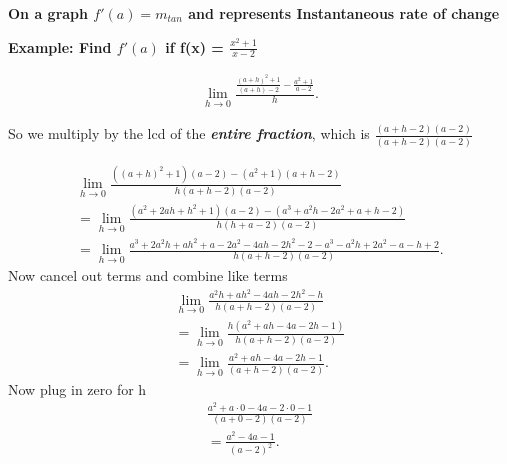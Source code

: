 \documentclass{report}
\begin{document}
        \bigbreak \noindent 
        \textbf{On a graph $f\prime (a) = m_{tan}$ and represents Instantaneous rate of change}

        \bigbreak \noindent \bigbreak \noindent 
        \begin{large}
            \textbf{Example: Find $f\prime (a)$ if f(x) = $\frac{x^2+1}{x-2}$}
        \end{large}
        
        \bigbreak \noindent \bigbreak \noindent 
        \begin{align*}
            \lim\limits_{h \to 0}{ \frac{ \frac{ \left(a+h\right)^2 + 1}{ \left(a+h\right)-2} - \frac{a^2+1}{a-2}}{h}}
        .\end{align*}

        \bigbreak \noindent 
        So we multiply by the lcd of the \textbf{\textit{entire fraction}}, which is $ \frac{ \left(a+h-2\right) \left(a-2\right)}{ \left(a+h-2\right) \left(a-2\right)}$

        \begin{align*}
            \lim\limits_{h \to 0}{ \frac{ \left( \left(a+h\right)^2+1\right) \left(a-2\right) - \left(a^2+1\right) \left(a+h-2\right)}{h \left(a+h-2\right) \left(a-2\right)}} \\ 
            = \lim\limits_{h \to 0}{ \frac{ \left(a^2+2ah+h^2+1\right) \left(a-2\right) - \left(a^3+a^2h-2a^2+a+h-2\right)}{h \left(h+a-2\right)(a-2)}} \\ 
            = \lim\limits_{h \to 0}{ \frac{a^3+2a^2h+ah^2+a-2a^2-4ah-2h^2-2-a^3-a^2h+2a^2-a-h+2}{h \left(a+h-2\right)(a-2)}}
        .\end{align*}
        \bigbreak \noindent 
        Now cancel out terms and combine like terms
        \begin{align*}
            \lim\limits_{h \to 0}{ \frac{a^2h+ah^2-4ah-2h^2-h}{h (a+h-2)(a-2)}} \\ 
            = \lim\limits_{h \to 0}{ \frac{h (a^2+ah-4a-2h-1)}{h (a+h-2)(a-2)}} \\
            = \lim\limits_{h \to 0}{ \frac{a^2+ah-4a-2h-1}{(a+h-2)(a-2)}}
        .\end{align*}
        \bigbreak \noindent 
        Now plug in zero for h
        \begin{align*}
            \frac{a^2+a \cdot 0 - 4a -2 \cdot 0 -1}{(a+0-2)(a-2)} \\
            = \frac{a^2-4a-1}{(a-2)^2}
        .\end{align*}
\end{document}
